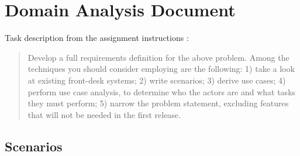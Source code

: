 %
%
%


\section{Domain Analysis Document}
Task description from the assignment instructions
\cite{2dv603:assignment1-instructions}:

\begin{quote}
  Develop a full requirements definition for the above problem. Among the
  techniques you should consider employing are the following: 1) take a look at
  existing front-desk systems; 2) write scenarios; 3) derive use cases; 4)
  perform use case analysis, to determine who the actors are and what tasks
  they must perform; 5) narrow the problem statement, excluding features that
  will not be needed in the first release.
\end{quote}


\subsection{Scenarios}
%
%
